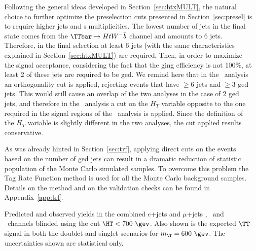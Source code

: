 Following the general ideas developed in Section~\ref{sec:htxMULT}, the
natural choice to further optimize the preselection cuts presented in 
Section~\ref{sec:presel} is to require higher jets and \bjet s multiplicities.
The lowest number of jets in the final state comes from the $\TTbar\to HtW^-\bar{b}$
channel and amounts to 6 jets. Therefore, in the final selection at least 6 jets
(with the same characteristics explained in Section~\ref{sec:htxMULT}) are required.
Then, in order to maximize the signal acceptance, considering the fact that the
\btag ging efficiency is not 100\%, at least 2 of these jets are
required to be \btag ged.
We remind here that in the \wbx\ analysis an orthogonality
cut is applied, rejecting events that have $\geq 6$ jets and $\geq 3$
\btag ged jets. This would still cause an overlap of the two analyses
in the case of 2 \btag ged jets, and therefore in the \htx\ analysis
a cut on the $H_T$ variable opposite to the one required in the 
signal regions of the \wbx\ analysis is applied. 
Since the definition of the $H_T$ variable is slightly different 
in the two analyses, the cut applied results conservative.

As was already hinted in Section~\ref{sec:trf}, 
applying direct cuts on the events based on the number of \btag ged jets
can result in a dramatic reduction of statistic population of the Monte
Carlo simulated samples. To overcome this problem the Tag Rate Function
method is used for all the Monte Carlo background samples. Details on
the method and on the validation checks can be found in Appendix~\ref{app:trf}.


\begin{table}[tb]\centering

\caption{Predicted and observed yields in the combined 
$e$+jets and $\mu$+jets \chii, \chiii\ and \chiv\ channels
blinded using the cut $\HT<700~\gev$. 
Also shown is the expected $\TT$ signal in both the doublet 
and singlet scenarios for $m_{\T}=600~\gev$. 
The uncertainties shown 
are 
statistical only.
\label{tab:Yields_blind}}
\end{table}


